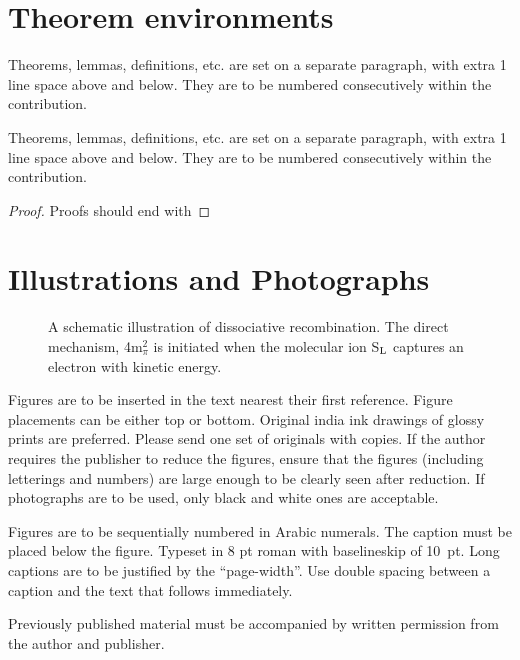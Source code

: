\documentclass{ws-jmmb}
\begin{document}
\section{Theorem environments}

\begin{theorem}
Theorems, lemmas, definitions, etc. are set on a separate paragraph,
with extra 1 line space above and below. They are to be numbered
consecutively within the contribution.
\end{theorem}

\begin{lemma}
Theorems, lemmas, definitions, etc. are set on a separate paragraph,
with extra 1 line space above and below. They are to be numbered
consecutively within the contribution.
\end{lemma}

\begin{proof}
Proofs should end with
\end{proof}

\section{Illustrations and Photographs}

\begin{figure}[b]
\centerline{}
\vspace*{8pt}
\caption{A schematic illustration of dissociative recombination. The
direct mechanism, 4m$^2_\pi$ is initiated when the
molecular ion S$_{\rm L}$ captures an electron with kinetic energy.}
\end{figure}

Figures are to be inserted in the text nearest their first reference.
Figure placements can be either top or bottom.  Original india ink
drawings of glossy prints are preferred. Please send one set of
originals with copies. If the author requires the publisher to reduce
the figures, ensure that the figures (including letterings and
numbers) are large enough to be clearly seen after reduction. If
photographs are to be used, only black and white ones are acceptable.

Figures are to be sequentially numbered in Arabic numerals. The
caption must be placed below the figure. Typeset in 8 pt roman with
baselineskip of 10~pt. Long captions are to be justified by the
``page-width''.  Use double spacing between a caption and the text
that follows immediately.

Previously published material must be accompanied by written
permission from the author and publisher.
\end{document}
